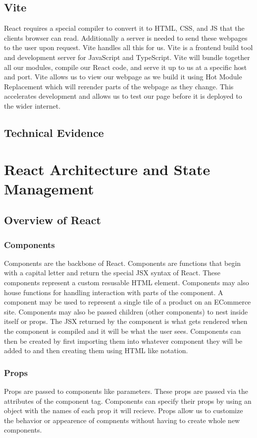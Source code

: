 \documentclass{article}[12pt]
\begin{document}
    \subsection{Vite}
    React requires a special compiler to convert it to HTML, CSS, and JS that the clients browser can read. Additionally a server is needed to send these webpages to the user upon request. Vite handles all this for us. Vite is a frontend build tool and development server for JavaScript and TypeScript. Vite will bundle together all our modules, compile our React code, and serve it up to us at a specific host and port. Vite allows us to view our webpage as we build it using Hot Module Replacement which will rerender parts of the webpage as they change. This accelerates development and allows us to test our page before it is deployed to the wider internet.

    \subsection{Technical Evidence}


    \section{React Architecture and State Management}
    \subsection{Overview of React}
    \subsubsection{Components}
    Components are the backbone of React. Components are functions that begin with a capital letter and return the special JSX syntax of React. These components represent a custom resusable HTML element. Components may also house functions for handling interaction with parts of the component. A component may be used to represent a single tile of a product on an ECommerce site. Components may also be passed children (other components) to nest inside itself or props. The JSX returned by the component is what gets rendered when the component is compiled and it will be what the user sees. Components can then be created by first importing them into whatever component they will be added to and then creating them using HTML like notation.
    
    \subsubsection{Props}
    Props are passed to components like parameters. These props are passed via the attributes of the component tag. Components can specify their props by using an object with the names of each prop it will recieve. Props allow us to customize the behavior or appearence of compnents without having to create whole new components.
    
\end{document}
